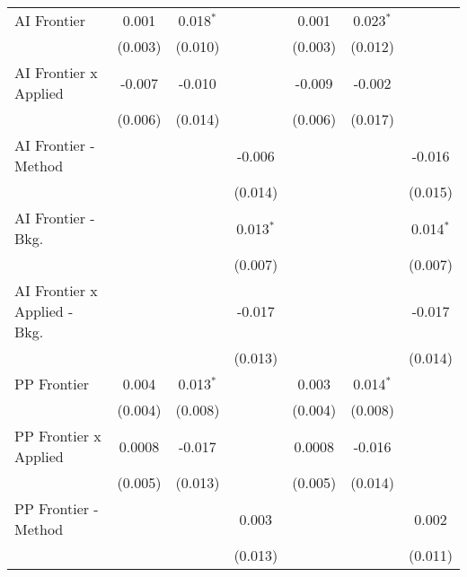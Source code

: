 \begin{tabular}{lcccccc}
   AI Frontier                    & 0.001        & 0.018$^{*}$ &                & 0.001          & 0.023$^{*}$ &   \\   
                                  & (0.003)      & (0.010)     &                & (0.003)        & (0.012)     &   \\   
   AI Frontier x Applied          & -0.007       & -0.010      &                & -0.009         & -0.002      &   \\   
                                  & (0.006)      & (0.014)     &                & (0.006)        & (0.017)     &   \\   
   AI Frontier - Method           &              &             & -0.006         &                &             & -0.016\\   
                                  &              &             & (0.014)        &                &             & (0.015)\\   
   AI Frontier - Bkg.             &              &             & 0.013$^{*}$    &                &             & 0.014$^{*}$\\   
                                  &              &             & (0.007)        &                &             & (0.007)\\   
   AI Frontier x Applied - Bkg.   &              &             & -0.017         &                &             & -0.017\\   
                                  &              &             & (0.013)        &                &             & (0.014)\\   
   PP Frontier                    & 0.004        & 0.013$^{*}$ &                & 0.003          & 0.014$^{*}$ &   \\   
                                  & (0.004)      & (0.008)     &                & (0.004)        & (0.008)     &   \\   
   PP Frontier x Applied          & 0.0008       & -0.017      &                & 0.0008         & -0.016      &   \\   
                                  & (0.005)      & (0.013)     &                & (0.005)        & (0.014)     &   \\   
   PP Frontier - Method           &              &             & 0.003          &                &             & 0.002\\   
                                  &              &             & (0.013)        &                &             & (0.011)\\   

\end{tabular}
